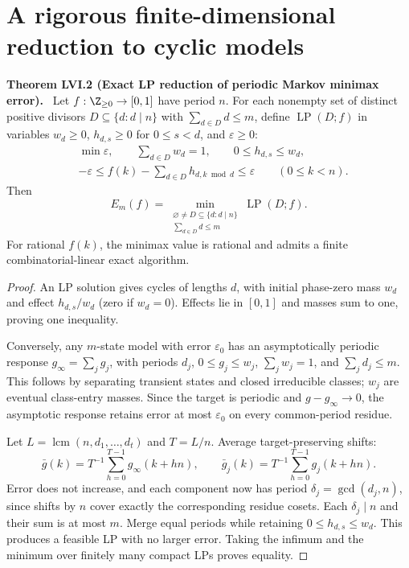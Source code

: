 \documentclass[11pt,a4paper,oneside]{book}
\DeclareMathOperator{\lcm}{lcm}\DeclareMathOperator{\spanR}{span_{\mathbb R}}
\newcommand{\statement}[3]{\par\medskip\noindent\textbf{#1 #2 (#3).}\ }
\begin{document}
\section{A rigorous finite-dimensional reduction to cyclic models}
\statement{Theorem}{LVI.2}{Exact LP reduction of periodic Markov minimax error}
Let $f:\Z_{\ge0}\to[0,1]$ have period $n$. For each nonempty set of distinct positive divisors $D\subseteq\{d:d\mid n\}$ with $\sum_{d\in D}d\le m$, define $\operatorname{LP}(D;f)$ in variables $w_d\ge0$, $h_{d,s}\ge0$ for $0\le s<d$, and $\varepsilon\ge0$:
\begin{equation}\begin{aligned}
&\min\varepsilon,\qquad\sum_{d\in D}w_d=1,\qquad0\le h_{d,s}\le w_d,\\
&-\varepsilon\le f(k)-\sum_{d\in D}h_{d,k\bmod d}\le\varepsilon\qquad(0\le k<n).
\end{aligned}\tag{340}\end{equation}
Then
\begin{equation}E_m(f)=\min_{\substack{\varnothing\ne D\subseteq\{d:d\mid n\}\\\sum_{d\in D}d\le m}}\operatorname{LP}(D;f).\tag{341}\end{equation}
For rational $f(k)$, the minimax value is rational and admits a finite combinatorial-linear exact algorithm.
\begin{proof}
An LP solution gives cycles of lengths $d$, with initial phase-zero mass $w_d$ and effect $h_{d,s}/w_d$ (zero if $w_d=0$). Effects lie in $[0,1]$ and masses sum to one, proving one inequality.

Conversely, any $m$-state model with error $\varepsilon_0$ has an asymptotically periodic response $g_\infty=\sum_jg_j$, with periods $d_j$, $0\le g_j\le w_j$, $\sum_jw_j=1$, and $\sum_jd_j\le m$. This follows by separating transient states and closed irreducible classes; $w_j$ are eventual class-entry masses. Since the target is periodic and $g-g_\infty\to0$, the asymptotic response retains error at most $\varepsilon_0$ on every common-period residue.

Let $L=\lcm(n,d_1,\ldots,d_t)$ and $T=L/n$. Average target-preserving shifts:
\[\bar g(k)=T^{-1}\sum_{h=0}^{T-1}g_\infty(k+hn),\qquad\bar g_j(k)=T^{-1}\sum_{h=0}^{T-1}g_j(k+hn).\]
Error does not increase, and each component now has period $\delta_j=\gcd(d_j,n)$, since shifts by $n$ cover exactly the corresponding residue cosets. Each $\delta_j\mid n$ and their sum is at most $m$. Merge equal periods while retaining $0\le h_{d,s}\le w_d$. This produces a feasible LP with no larger error. Taking the infimum and the minimum over finitely many compact LPs proves equality.
\end{proof}
\end{document}
